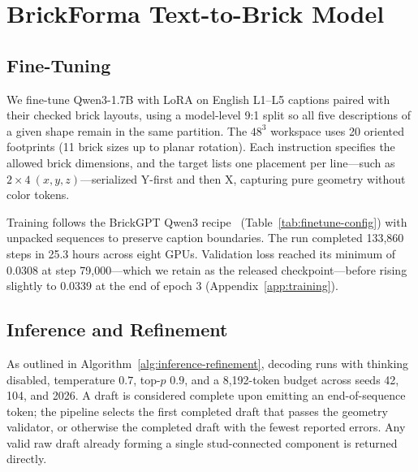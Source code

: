 \documentclass[letterpaper]{article} %
\begin{document}
\section{BrickForma Text-to-Brick Model}
\label{sec:model}
\subsection{Fine-Tuning}
\label{sec:training}
We fine-tune Qwen3-1.7B with LoRA on English L1--L5 captions paired with their checked brick layouts, using a model-level 9:1 split so all five descriptions of a given shape remain in the same partition. The $48^3$ workspace uses 20 oriented footprints (11 brick sizes up to planar rotation). Each instruction specifies the allowed brick dimensions, and the target lists one placement per line---such as $2{\times}4\ (x,y,z)$---serialized Y-first and then X, capturing pure geometry without color tokens.

Training follows the BrickGPT Qwen3 recipe~\cite{brickgpt} (Table~\ref{tab:finetune-config}) with unpacked sequences to preserve caption boundaries. The run completed 133,860 steps in 25.3 hours across eight GPUs. Validation loss reached its minimum of 0.0308 at step 79,000---which we retain as the released checkpoint---before rising slightly to 0.0339 at the end of epoch 3 (Appendix~\ref{app:training}).


\subsection{Inference and Refinement}
As outlined in Algorithm~\ref{alg:inference-refinement}, decoding runs with thinking disabled, temperature $0.7$, top-$p$ $0.9$, and a 8,192-token budget across seeds 42, 104, and 2026. A draft is considered complete upon emitting an end-of-sequence token; the pipeline selects the first completed draft that passes the geometry validator, or otherwise the completed draft with the fewest reported errors. Any valid raw draft already forming a single stud-connected component is returned directly.
\end{document}
